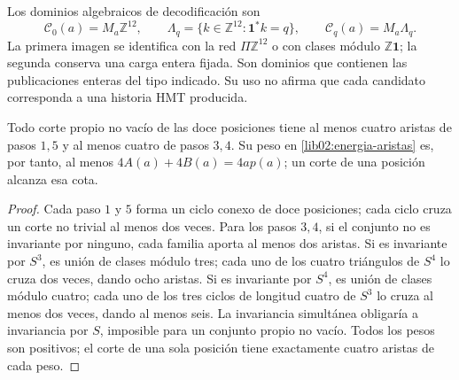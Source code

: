 Los dominios algebraicos de decodificación son
\[
 \mathcal C_0(a)=M_a\mathbb Z^{12},\qquad
 \Lambda_q=\{k\in\mathbb Z^{12}:\mathbf1^*k=q\},\qquad
 \mathcal C_q(a)=M_a\Lambda_q.
\]
La primera imagen se identifica con la red \(\Pi\mathbb Z^{12}\)
o con clases módulo \(\mathbb Z\mathbf1\); la segunda conserva una
carga entera fijada. Son dominios que contienen las publicaciones enteras
del tipo indicado. Su uso no afirma que cada candidato corresponda a una
historia HMT producida.

\begin{lemma}
\label{lib02:cortes}
Todo corte propio no vacío de las doce posiciones tiene al menos cuatro
aristas de pasos \(1,5\) y al menos cuatro de pasos \(3,4\). Su peso
en \eqref{lib02:energia-aristas} es, por tanto, al menos
\(4A(a)+4B(a)=4ap(a)\); un corte de una posición alcanza esa cota.
\end{lemma}
\begin{proof}
Cada paso \(1\) y \(5\) forma un ciclo conexo de doce posiciones;
cada ciclo cruza un corte no trivial al menos dos veces. Para los pasos
\(3,4\), si el conjunto no es invariante por ninguno, cada familia
aporta al menos dos aristas. Si es invariante por \(S^3\), es unión
de clases módulo tres; cada uno de los cuatro triángulos de \(S^4\)
lo cruza dos veces, dando ocho aristas. Si es invariante por \(S^4\),
es unión de clases módulo cuatro; cada uno de los tres ciclos de longitud
cuatro de \(S^3\) lo cruza al menos dos veces, dando al menos seis.
La invariancia simultánea obligaría a invariancia por \(S\), imposible
para un conjunto propio no vacío. Todos los pesos son positivos; el
corte de una sola posición tiene exactamente cuatro aristas de cada
peso.
\end{proof}

